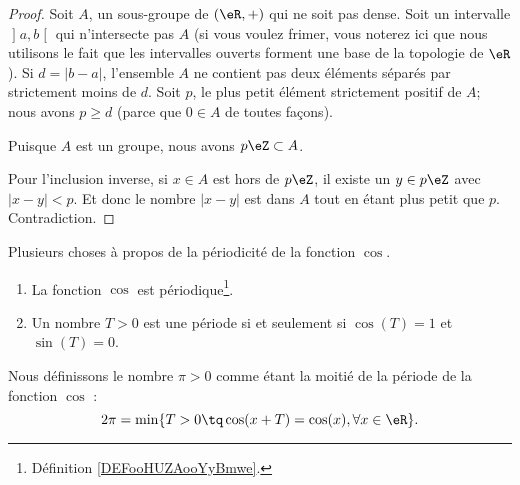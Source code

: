 \begin{proof}
	Soit \( A\), un sous-groupe de \( (\eR,+)\) qui ne soit pas dense. Soit un intervalle \( \mathopen] a , b \mathclose[\) qui n'intersecte pas \( A\) (si vous voulez frimer, vous noterez ici que nous utilisons le fait que les intervalles ouverts forment une base de la topologie de \( \eR\)). Si \( d=| b-a |\), l'ensemble \( A\) ne contient pas deux éléments séparés par strictement moins de \( d\). Soit \( p\), le plus petit élément strictement positif de \( A\); nous avons \( p\geq d\) (parce que \( 0\in A\) de toutes façons).

	Puisque \( A\) est un groupe, nous avons \( p\eZ\subset A\).

	Pour l'inclusion inverse, si \( x\in A\) est hors de \( p\eZ\), il existe un \( y\in p\eZ\) avec \( | x-y |<p\). Et donc le nombre \( | x-y |\) est dans \( A\) tout en étant plus petit que \( p\). Contradiction.
\end{proof}

\begin{propositionDef}      \label{PROPooFRVCooKSgYUM}
	Plusieurs choses à propos de la périodicité de la fonction \( \cos\).
	\begin{enumerate}
		\item
		      La fonction \( \cos\) est périodique\footnote{Définition \ref{DEFooHUZAooYyBmwe}.}.
		\item       \label{ITEMooVPMWooBqidZG}
		      Un nombre \( T>0\) est une période si et seulement si \( \cos(T)=1\) et \( \sin(T)=0\).
	\end{enumerate}

	Nous définissons le nombre \( \pi>0\) comme étant la moitié de la période de la fonction \( \cos\) :
	\begin{equation}
		2\pi=\min\{ T>0\tq \cos(x+T)=\cos(x) , \forall x \in \eR\}.
	\end{equation}

\end{propositionDef}


